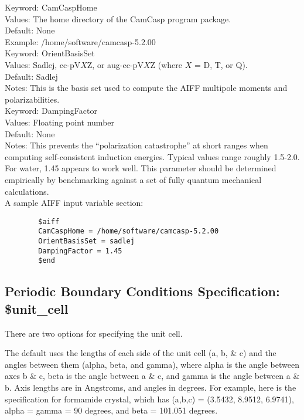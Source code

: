 \documentclass[11pt,letterpaper]{article}
\begin{document}
\begin{spacing}{1.0}
\vspace{3mm}
\noindent
Keyword: CamCaspHome \\
Values:  The home directory of the CamCasp program package. \\
Default: None \\
Example: /home/software/camcasp-5.2.00   \\

\vspace{3mm}
\noindent
Keyword: OrientBasisSet \\
Values:  Sadlej, cc-pV$X$Z, or aug-cc-pV$X$Z (where $X$ = D, T, or Q). \\
Default: Sadlej \\
Notes: This is the basis set used to compute the AIFF multipole moments
and polarizabilities. \\

\vspace{3mm}
\noindent
Keyword: DampingFactor \\
Values: Floating point number \\
Default: None \\
Notes: This prevents the ``polarization catastrophe'' at short ranges
when computing self-consistent induction energies.  Typical values
range roughly 1.5-2.0. For water, 1.45 appears to work well.  This
parameter should be determined empirically by benchmarking against a
set of fully quantum mechanical calculations. \\

\noindent
A sample AIFF input variable section:
\begin{verbatim}
        $aiff
        CamCaspHome = /home/software/camcasp-5.2.00
        OrientBasisSet = sadlej
        DampingFactor = 1.45
        $end
\end{verbatim}

\subsection{Periodic Boundary Conditions Specification: \$unit\_cell}
	There are two options for specifying the unit cell.

	The default uses the lengths of each side of the unit cell (a,
        b, \& c) and the angles between them (alpha, beta, and gamma),
        where alpha is the angle between axes b \& c, beta is the
        angle between a \& c, and gamma is the angle between a \& b.
        Axis lengths are in Angstroms, and angles in degrees.  For
        example, here is the specification for formamide crystal,
        which has (a,b,c) = (3.5432, 8.9512, 6.9741), alpha = gamma =
        90 degrees, and beta = 101.051 degrees.


\end{spacing}
\end{document}
